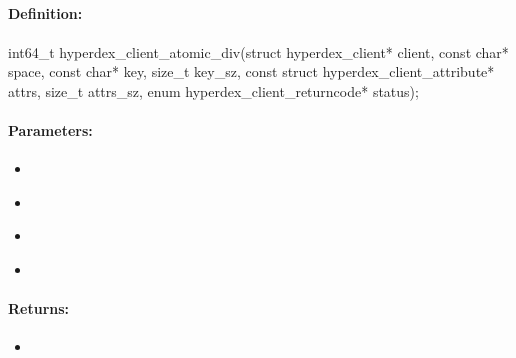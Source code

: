\pagebreak
\subsection{}
\label{api:c:atomic_div}


\paragraph{Definition:}
\begin{ccode}
int64_t hyperdex_client_atomic_div(struct hyperdex_client* client,
        const char* space,
        const char* key, size_t key_sz,
        const struct hyperdex_client_attribute* attrs, size_t attrs_sz,
        enum hyperdex_client_returncode* status);
\end{ccode}

\paragraph{Parameters:}
\begin{itemize}[noitemsep]
\item {}\\

\item {}\\

\item {}\\

\item {}\\

\end{itemize}

\paragraph{Returns:}
\begin{itemize}[noitemsep]
\item {}\\

\end{itemize}

